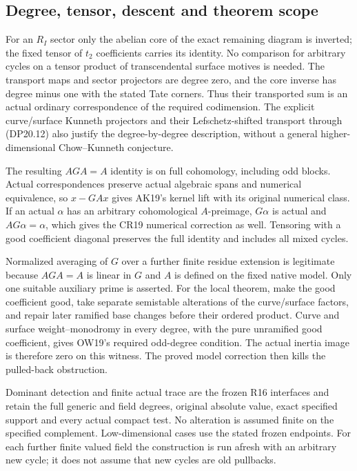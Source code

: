 \subsection{Degree, tensor, descent and theorem scope}

For an $R_I$ sector only the abelian core of the exact remaining
diagram is inverted; the fixed tensor of $t_2$ coefficients
carries its identity. No comparison for arbitrary cycles on a
tensor product of transcendental surface motives is needed.
The transport maps and sector projectors are degree zero, and
the core inverse has degree minus one with the stated Tate
corners. Thus their transported sum is an actual ordinary
correspondence of the required codimension. The explicit
curve/surface Kunneth projectors and their Lefschetz-shifted
transport through (DP20.12) also justify the degree-by-degree
description, without a general higher-dimensional
Chow--Kunneth conjecture.

The resulting $AGA=A$ identity is on full cohomology,
including odd blocks. Actual correspondences preserve actual
algebraic spans and numerical equivalence, so $x-GAx$ gives
AK19's kernel lift with its original numerical class. If an
actual $\alpha$ has an arbitrary cohomological $A$-preimage,
$G\alpha$ is actual and $AG\alpha=\alpha$, which gives the
CR19 numerical correction as well. Tensoring with a good
coefficient diagonal preserves the full identity and includes
all mixed cycles.

Normalized averaging of $G$ over a further finite residue
extension is legitimate because $AGA=A$ is linear in $G$
and $A$ is defined on the fixed native model. Only one suitable
auxiliary prime is asserted. For the local theorem, make the
good coefficient good, take separate semistable alterations
of the curve/surface factors, and repair later ramified base
changes before their ordered product. Curve and surface
weight--monodromy in every degree, with the pure unramified
good coefficient, gives OW19's required odd-degree condition.
The actual inertia image is therefore zero on this witness.
The proved model correction then kills the pulled-back
obstruction.

Dominant detection and finite actual trace are the frozen R16
interfaces and retain the full generic and field degrees,
original absolute value, exact specified support and every
actual compact test. No alteration is assumed finite on the
specified complement. Low-dimensional cases use the stated
frozen endpoints. For each further finite valued field the
construction is run afresh with an arbitrary new cycle; it
does not assume that new cycles are old pullbacks.

